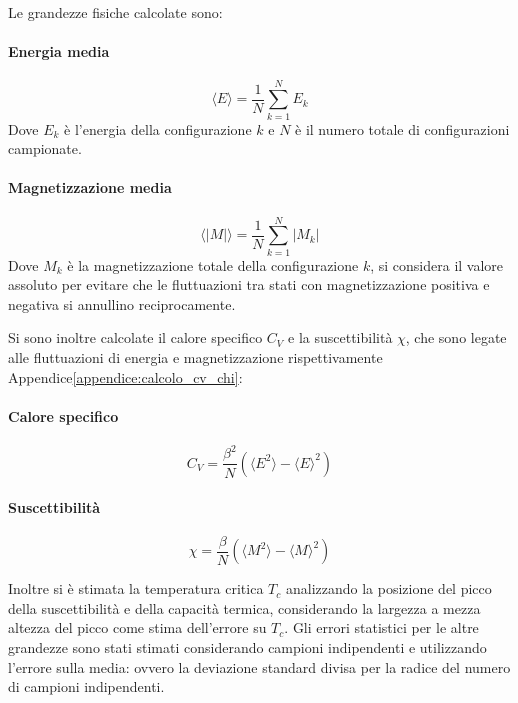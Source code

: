 Le grandezze fisiche calcolate sono:

\paragraph{Energia media}
\begin{equation}
\langle E \rangle = \frac{1}{N} \sum_{k=1}^{N} E_k
\end{equation}
Dove $E_k$ è l’energia della configurazione $k$ e $N$ è il numero totale di configurazioni campionate.

\paragraph{Magnetizzazione media}
\begin{equation}
\langle |M| \rangle = \frac{1}{N} \sum_{k=1}^{N} |M_k|
\end{equation}
Dove $M_k$ è la magnetizzazione totale della configurazione $k$, si considera il valore assoluto per evitare che le fluttuazioni tra stati con magnetizzazione positiva e negativa si annullino reciprocamente.

Si sono inoltre calcolate il calore specifico $C_V$ e la suscettibilità $\chi$, che sono legate alle fluttuazioni di energia e magnetizzazione rispettivamente Appendice\ref{appendice:calcolo_cv_chi}:
\paragraph{Calore specifico}
\begin{equation}
C_V = \frac{\beta^2}{N} \left( \langle E^2 \rangle - \langle E \rangle^2 \right)
\end{equation}

\paragraph{Suscettibilità}
\begin{equation}
\chi = \frac{\beta}{N} \left( \langle M^2 \rangle - \langle M \rangle^2 \right)
\end{equation}

Inoltre si è stimata la temperatura critica $T_c$ analizzando la posizione del picco della suscettibilità e della capacità termica, 
considerando la largezza a mezza altezza del picco come stima dell'errore su $T_c$. Gli errori statistici per le altre grandezze 
sono stati stimati considerando campioni indipendenti e utilizzando l'errore sulla media: ovvero la deviazione 
standard divisa per la radice del numero di campioni indipendenti.

